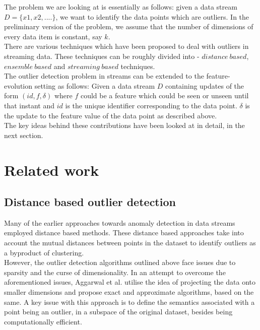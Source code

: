 The problem we are looking at is essentially as follows: given a data stream $D = \{x1, x2, ....\}$, we want to identify the data points which are outliers. In the preliminary version of the problem, we assume that the number of dimensions of every data item is constant, say $k$.\\

There are various techniques\cite{tran2016distance}\cite{tan2011fast}\cite{aggarwal2013outlier} which have been proposed to deal with outliers in streaming data. These techniques can be roughly divided into - $distance\ based$, $ensemble\ based$ and $streaming\ based$ techniques. \\

The outlier detection problem in streams can be extended to the feature-evolution setting as follows: Given a data stream $D$ containing updates of the form $(id, f, \delta)$ where $f$ could be a feature which could be seen or unseen until that instant and $id$ is the unique identifier corresponding to the data point. $\delta$ is the update to the feature value of the data point as described above. \\

The key ideas behind these contributions have been looked at in detail, in the next section.

\section{Related work}

\subsection{Distance based outlier detection}

Many of the earlier approaches towards anomaly detection in data streams employed distance based methods. These distance based approaches take into account the mutual distances between points in the dataset to identify outliers as a byproduct of clustering. \\

However, the outlier detection algorithms outlined above face issues due to sparsity and the curse of dimensionality. In an attempt to overcome the aforementioned issues, Aggarwal et al. utilise the idea of projecting the data onto smaller dimensions\cite{aggarwal2001outlier} and propose exact and approximate algorithms, based on the same. A key issue with this approach is to define the semantics associated with a point being an outlier, in a subspace of the original dataset, besides being computationally efficient. \\

